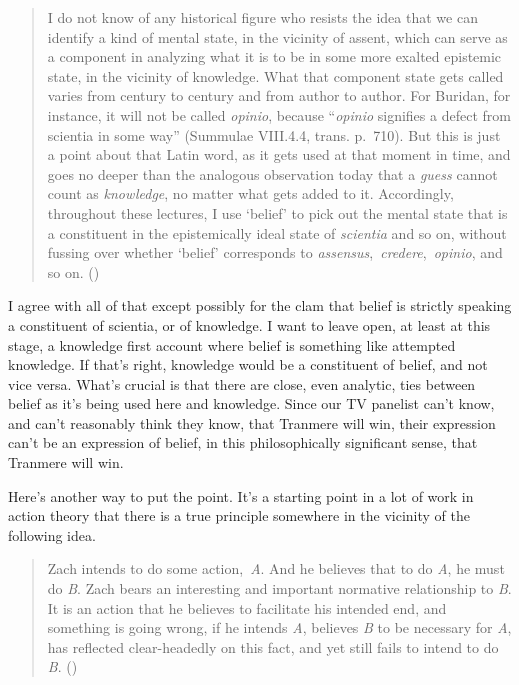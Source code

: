 \documentclass[
  12pt,
  letterpaper,
]{scrbook}
\begin{document}
\begin{quote}
I do not know of any historical figure who resists the idea that we can
identify a kind of mental state, in the vicinity of assent, which can
serve as a component in analyzing what it is to be in some more exalted
epistemic state, in the vicinity of knowledge. What that component state
gets called varies from century to century and from author to author.
For Buridan, for instance, it will not be called \emph{opinio}, because
``\emph{opinio} signifies a defect from scientia in some way'' (Summulae
VIII.4.4, trans. p.~710). But this is just a point about that Latin
word, as it gets used at that moment in time, and goes no deeper than
the analogous observation today that a \emph{guess} cannot count as
\emph{knowledge}, no matter what gets added to it. Accordingly,
throughout these lectures, I use `belief' to pick out the mental state
that is a constituent in the epistemically ideal state of
\emph{scientia} and so on, without fussing over whether `belief'
corresponds to \emph{assensus},~\emph{credere},~\emph{opinio}, and so
on. ()
\end{quote}

I agree with all of that except possibly for the clam that belief is
strictly speaking a constituent of scientia, or of knowledge. I want to
leave open, at least at this stage, a knowledge first account where
belief is something like attempted knowledge. If that's right, knowledge
would be a constituent of belief, and not vice versa. What's crucial is
that there are close, even analytic, ties between belief as it's being
used here and knowledge. Since our TV panelist can't know, and can't
reasonably think they know, that Tranmere will win, their expression
can't be an expression of belief, in this philosophically significant
sense, that Tranmere will win.

Here's another way to put the point. It's a starting point in a lot of
work in action theory that there is a true principle somewhere in the
vicinity of the following idea.

\begin{quote}
Zach intends to do some action,~\emph{A}. And he believes that to do
\emph{A}, he must do \emph{B}. Zach bears an interesting and important
normative relationship to \emph{B}. It is an action that he believes to
facilitate his intended end, and something is going wrong, if he intends
\emph{A}, believes \emph{B} to be necessary for \emph{A}, has reflected
clear-headedly on this fact, and yet still fails to intend to do
\emph{B}. ()
\end{quote}
\end{document}
